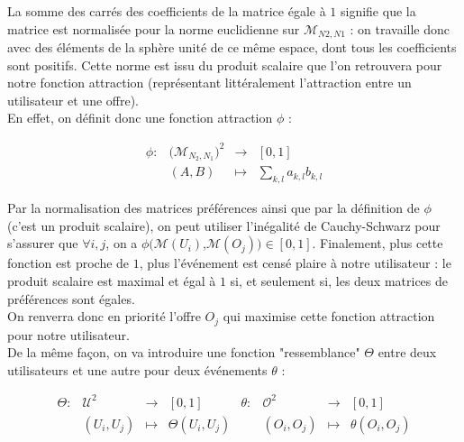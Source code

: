 \documentclass[11pt, oneside]{article}
\begin{document}
La somme des carrés des coefficients de la matrice égale à $1$ signifie que la matrice est normalisée pour la norme euclidienne sur $\mathcal{M}_{N2,N1} $ : on travaille donc avec des éléments de la sphère unité de ce même espace, dont tous les coefficients sont positifs. Cette norme est issu du produit scalaire  que l'on retrouvera pour notre fonction attraction (représentant littéralement l'attraction entre un utilisateur et une offre). \\

En effet, on définit donc une fonction attraction $\phi$ :

\begin{center}
\[
\begin{array}{l|rcl}
\phi : & \big( \mathcal{M}_{N_2,N_1} \big)^{2} & \longrightarrow & [0,1] \\
    & (A,B) & \longmapsto & \displaystyle \sum _{k,l} a_{k,l}b_{k,l} \end{array}
\]

\end{center}

Par la normalisation des matrices préférences ainsi que par la définition de $\phi$ (c'est un produit scalaire), on peut utiliser l'inégalité de Cauchy-Schwarz pour s'assurer que $\forall i,j$, on a $\phi (\mathcal{M} (U_i)$,$\mathcal{M} (O_j)) \in [0,1]$. Finalement, plus cette fonction est proche de $1$, plus l'événement est censé plaire à notre utilisateur : le produit scalaire est maximal et égal à $1$ si, et seulement si, les deux matrices de préférences sont égales. \\ On renverra donc en priorité l'offre $O_j$ qui maximise cette fonction attraction pour notre utilisateur.  \\

De la même façon, on va introduire une fonction "ressemblance" $\Theta$ entre deux utilisateurs et une autre pour deux événements $\theta$ :

\begin{center}
\[
\begin{array}{l|rcl}
\Theta : &  \mathcal{U}^{2} & \longrightarrow & [0,1] \\
    & (U_i,U_j) & \longmapsto & \Theta (U_i,U_j) \end{array}
\begin{array}{l|rcl}
\theta : & \mathcal{O}^{2} & \longrightarrow & [0,1] \\
    & (O_i,O_j) & \longmapsto & \theta (O_i,O_j) \end{array}
\]
\end{center}
\end{document}
